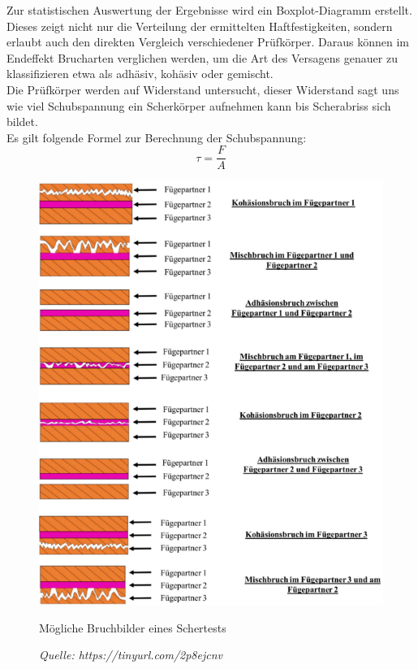 Zur statistischen Auswertung der Ergebnisse wird ein Boxplot-Diagramm erstellt. 
Dieses zeigt nicht nur die Verteilung der ermittelten Haftfestigkeiten, sondern erlaubt auch den direkten Vergleich verschiedener Prüfkörper.
Daraus können im Endeffekt Brucharten verglichen werden, um die Art des Versagens genauer zu klassifizieren etwa als adhäsiv, kohäsiv oder gemischt.\\
Die Prüfkörper werden auf Widerstand untersucht, dieser Widerstand sagt uns wie viel Schubspannung ein Scherkörper aufnehmen kann bis Scherabriss sich bildet.\\
Es gilt folgende Formel zur Berechnung der Schubspannung:\\
\begin{equation}
    \tau = \frac{F}{A}
\end{equation}   
\vspace{0.2cm}
\begin{figure}
    \centering
    \includegraphics{Bilder/Brucharten.png}
    \caption{Mögliche Bruchbilder eines Schertests}
    \caption*{\textit{Quelle: https://tinyurl.com/2p8ejcnv }}
    \vspace{0.2cm}
    \label{Abb.3: Mögliche Bruchbilder eines Schertests}
\end{figure}
\\
